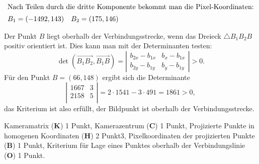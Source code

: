 \begin{loesung}
\begin{teilaufgaben}
\begin{align*}
\intertext{Nach Teilen durch die dritte Komponente bekommt man die
Pixel-Koordinaten:}
B_1&=(-1492,143)
&
B_2&=(175,146)
\end{align*}
\item
Der Punkt $B$ liegt oberhalb der Verbindungsstrecke, wenn das Dreieck
$\triangle B_1B_2B$ positiv orientiert ist. 
Dies kann man mit der Determinanten testen:
\[
\det(\overrightarrow{B_1B_2},\overrightarrow{B_1B})
=
\left|
\begin{matrix}
b_{2x}-b_{1x}&b_x-b_{1x}\\
b_{2y}-b_{1y}&b_y-b_{1y}
\end{matrix}
\right|
> 0.
\]
Für den Punkt $B=(66,148)$ ergibt sich die Determinante
\[
\left|
\begin{matrix}
1667& 3\\
2158& 5\\
\end{matrix}
\right|
=
2\cdot 1541 - 3\cdot 491 
=
1861 > 0,
\]
das Kriterium ist also erfüllt, der Bildpunkt ist oberhalb der
Verbindungsstrecke.
\qedhere
\end{teilaufgaben}
\end{loesung}

\begin{bewertung}
Kameramatrix ({\bf K}) 1 Punkt,
Kamerazentrum ({\bf C}) 1 Punkt,
Projizierte Punkte in homogenen Koordinaten ({\bf H}) 2 Punkt3,
Pixelkoordinaten der projizierten Punkte ({\bf B}) 1 Punkt,
Kriterium für Lage eines Punktes oberhalb der Verbindungslinie 
({\bf O}) 1 Punkt.
\end{bewertung}


